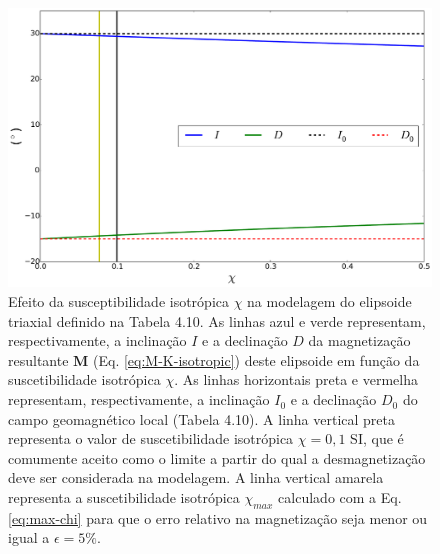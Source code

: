 \begin{figure}[hbt!]
	\centering \includegraphics[width=15 cm,height=10 cm]{figures/test_k_triaxial}
	\caption[Efeito da susceptibilidade isotrópica $\chi$ na modelagem do elipsoide triaxial definido na Tabela 4.10. As linhas azul e verde representam, respectivamente, a inclinação $I$ e a declinação $D$ da magnetização resultante $\mathbf{M}$ (Eq. \ref{eq:M-K-isotropic}) deste elipsoide em função da suscetibilidade isotrópica $\chi$. As linhas horizontais preta e vermelha representam, respectivamente, a inclinação $I_{0}$ e a declinação $D_{0}$ do campo geomagnético local (Tabela 4.10). A linha vertical preta representa o valor de suscetibilidade isotrópica $\chi = 0,1$ SI, que é comumente aceito como o limite a partir do qual a desmagnetização deve ser considerada na modelagem. A linha vertical amarela representa a suscetibilidade isotrópica $\chi_{max}$ calculado com a Eq. \ref{eq:max-chi} para que o erro relativo na magnetização seja menor ou igual a $\epsilon = 5 \%$.]
	{Efeito da susceptibilidade isotrópica $\chi$ na modelagem do elipsoide triaxial definido na Tabela 4.10. As linhas azul e verde representam, respectivamente, a inclinação $I$ e a declinação $D$ da magnetização resultante $\mathbf{M}$ (Eq. \ref{eq:M-K-isotropic}) deste elipsoide em função da suscetibilidade isotrópica $\chi$. As linhas horizontais preta e vermelha representam, respectivamente, a inclinação $I_{0}$ e a declinação $D_{0}$ do campo geomagnético local (Tabela 4.10). A linha vertical preta representa o valor de suscetibilidade isotrópica $\chi = 0,1$ SI, que é comumente aceito como o limite a partir do qual a desmagnetização deve ser considerada na modelagem. A linha vertical amarela representa a suscetibilidade isotrópica $\chi_{max}$ calculado com a Eq. \ref{eq:max-chi} para que o erro relativo na magnetização seja menor ou igual a $\epsilon = 5 \%$.}
	\label{fig:test_k_triaxial}
\end{figure}